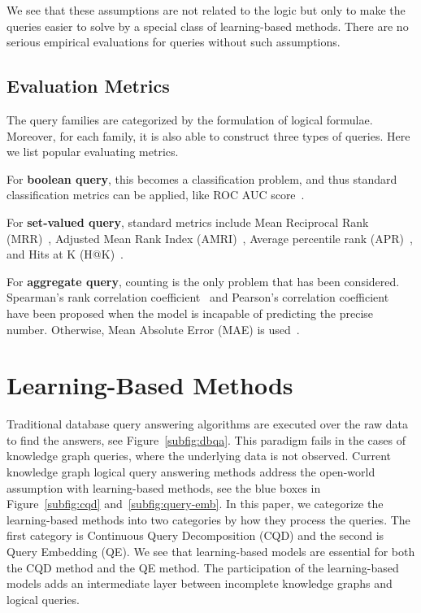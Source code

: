 \documentclass[11pt]{article}
\begin{document}
We see that these assumptions are not related to the logic but only to make the queries easier to solve by a special class of learning-based methods. There are no serious empirical evaluations for queries without such assumptions.

\subsection{Evaluation Metrics}
The query families are categorized by the formulation of logical formulae. Moreover, for each family, it is also able to construct three types of queries. Here we list popular evaluating metrics.
\begin{compactitem}
\item For \textbf{boolean query}, this becomes a classification problem, and thus standard classification metrics can be applied, like ROC AUC score~\cite{Ren2020BetaEmbeddings, Hamilton2018EmbeddingLogical}.  
\item For \textbf{set-valued query}, standard metrics include Mean Reciprocal Rank (MRR)~\cite{Ren2020Query2boxReasoning},  Adjusted Mean Rank Index (AMRI)~\cite{Alivanistos2022QueryEmbedding}, Average percentile rank (APR)~\cite{Hamilton2018EmbeddingLogical}, and Hits at K (H@K)~\cite{Ren2020Query2boxReasoning}.
\item For \textbf{aggregate query}, counting is the only problem that has been considered. Spearman's rank correlation coefficient~\cite{Ren2020BetaEmbeddings} and Pearson's correlation coefficient~\cite{Luus2021LogicEmbeddings} have been proposed when the model is incapable of predicting the precise number. Otherwise, Mean Absolute Error (MAE) is used~\cite{Luus2021LogicEmbeddings}.
\end{compactitem}

\section{Learning-Based Methods}\label{sec:method}
Traditional database query answering algorithms are executed over the raw data to find the answers, see Figure~\ref{subfig:dbqa}. This paradigm fails in the cases of knowledge graph queries, where the underlying data is not observed. 
Current knowledge graph logical query answering methods address the open-world assumption with learning-based methods, see the blue boxes in Figure~\ref{subfig:cqd} and~\ref{subfig:query-emb}.
In this paper, we categorize the learning-based methods into two categories by how they process the queries. The first category is Continuous Query Decomposition (CQD) and the second is Query Embedding (QE). We see that learning-based models are essential for both the CQD method and the QE method. The participation of the learning-based models adds an intermediate layer between incomplete knowledge graphs and logical queries.
\end{document}
